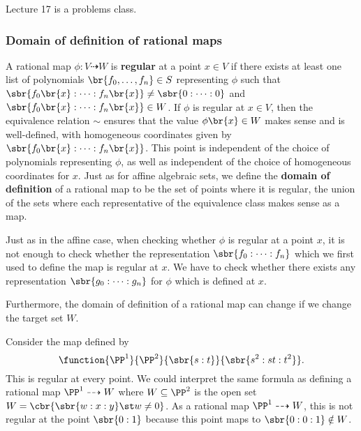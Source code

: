 Lecture 17 is a problems class.

\pagebreak

\subsubsection{Domain of definition of rational maps}


\begin{definition*}
A rational map $ \phi : V \dashrightarrow W $ is \textbf{regular} at a point $ x \in V $ if there exists at least one list of polynomials $ \br{f_0, \dots, f_n} \in S $ representing $ \phi $ such that $ \sbr{f_0\br{x} : \dots : f_n\br{x}} \ne \sbr{0 : \dots : 0} $ and $ \sbr{f_0\br{x} : \dots : f_n\br{x}} \in W $. If $ \phi $ is regular at $ x \in V $, then the equivalence relation $ \sim $ ensures that the value $ \phi\br{x} \in W $ makes sense and is well-defined, with homogeneous coordinates given by $ \sbr{f_0\br{x} : \dots : f_n\br{x}} $. This point is independent of the choice of polynomials representing $ \phi $, as well as independent of the choice of homogeneous coordinates for $ x $. Just as for affine algebraic sets, we define the \textbf{domain of definition} of a rational map to be the set of points where it is regular, the union of the sets where each representative of the equivalence class makes sense as a map.
\end{definition*}

\begin{note*}
Just as in the affine case, when checking whether $ \phi $ is regular at a point $ x $, it is not enough to check whether the representation $ \sbr{f_0 : \dots : f_n} $ which we first used to define the map is regular at $ x $. We have to check whether there exists any representation $ \sbr{g_0 : \dots : g_n} $ for $ \phi $ which is defined at $ x $.
\end{note*}

\begin{note*}
Furthermore, the domain of definition of a rational map can change if we change the target set $ W $.
\end{note*}

\begin{example*}
Consider the map defined by
$$ \function{\PP^1}{\PP^2}{\sbr{s : t}}{\sbr{s^2 : st : t^2}}. $$
This is regular at every point. We could interpret the same formula as defining a rational map $ \PP^1 \dashrightarrow W $ where $ W \subseteq \PP^2 $ is the open set $ W = \cbr{\sbr{w : x : y} \st w \ne 0} $. As a rational map $ \PP^1 \dashrightarrow W $, this is not regular at the point $ \sbr{0 : 1} $ because this point maps to $ \sbr{0 : 0 : 1} \notin W $.
\end{example*}

